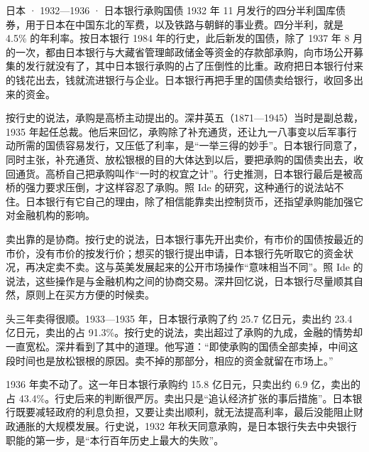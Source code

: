 \begin{case}{日本 · 1932—1936 · 日本银行承购国债}
1932 年 11 月发行的四分半利国库债券，用于日本在中国东北的军费，以及铁路与朝鲜的事业费\cite{boj1984}。四分半利，就是 4.5\% 的年利率。按日本银行 1984 年的行史，此后新发的国债，除了 1937 年 8 月的一次，都由日本银行与大藏省管理邮政储金等资金的存款部承购，向市场公开募集的发行就没有了，其中日本银行承购的占了压倒性的比重\cite{boj1984}。政府把日本银行付来的钱花出去，钱就流进银行与企业。日本银行再把手里的国债卖给银行，收回多出来的资金\cite{boj1984}。

按行史的说法，承购是高桥主动提出的\cite{boj1984}。深井英五（1871—1945）当时是副总裁，1935 年起任总裁\cite{boj1984,loc30}。他后来回忆，承购除了补充通货，还让九一八事变以后军事行动所需的国债容易发行，又压低了利率，是“一举三得的妙手”\cite{boj1984}。日本银行同意了，同时主张，补充通货、放松银根的目的大体达到以后，要把承购的国债卖出去，收回通货\cite{boj1984}。高桥自己把承购叫作“一时的权宜之计”。行史推测，日本银行最后是被高桥的强力要求压倒，才这样容忍了承购\cite{boj1984}。照 Ide 的研究，这种通行的说法站不住。日本银行有它自己的理由，除了相信能靠卖出控制货币，还指望承购能加强它对金融机构的影响\cite{ide2003}。

卖出靠的是协商。按行史的说法，日本银行事先开出卖价，有市价的国债按最近的市价，没有市价的按发行价；想买的银行提出申请，日本银行先听取它的资金状况，再决定卖不卖\cite{boj1984}。这与英美发展起来的公开市场操作“意味相当不同”\cite{boj1984}。照 Ide 的说法，这些操作是与金融机构之间的协商交易\cite{ide2003}。深井回忆说，日本银行尽量顺其自然，原则上在买方方便的时候卖\cite{boj1984}。

头三年卖得很顺。1933—1935 年，日本银行承购了约 25.7 亿日元，卖出约 23.4 亿日元，卖出的占 91.3\%\cite{boj1984}。按行史的说法，卖出超过了承购的九成，金融的情势却一直宽松\cite{boj1984}。深井看到了其中的道理。他写道：“即使承购的国债全部卖掉，中间这段时间也是放松银根的原因。卖不掉的那部分，相应的资金就留在市场上。”\cite{boj1984}

1936 年卖不动了。这一年日本银行承购约 15.8 亿日元，只卖出约 6.9 亿，卖出的占 43.4\%\cite{boj1984}。行史后来的判断很严厉。卖出只是“追认经济扩张的事后措施”\cite{boj1984}。日本银行既要减轻政府的利息负担，又要让卖出顺利，就无法提高利率，最后没能阻止财政通胀的大规模发展\cite{boj1984}。行史说，1932 年秋天同意承购，是日本银行失去中央银行职能的第一步，是“本行百年历史上最大的失败”\cite{boj1984}。
\end{case}

